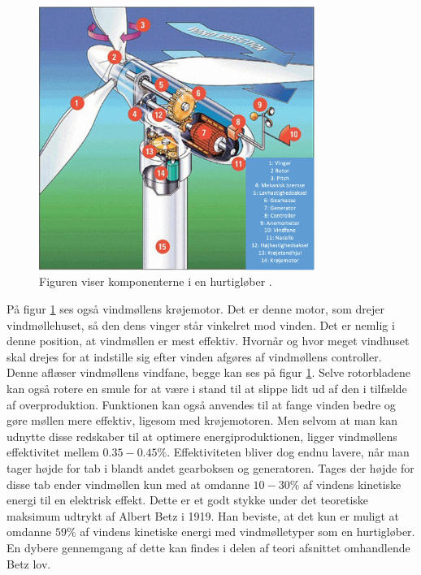 \begin{figure}[H]
\centering
\includegraphics[width=0.80\textwidth]{billeder/vindmollen}
\caption{Figuren viser komponenterne i en hurtigløber \citep{windturbine}.}
\label{fig:vindmollen}
\end{figure}

På figur \ref{fig:vindmollen} ses også vindmøllens krøjemotor. Det er denne motor, som drejer vindmøllehuset, så den dens vinger står vinkelret mod vinden. Det er nemlig i denne position, at vindmøllen er mest effektiv. Hvornår og hvor meget vindhuset skal drejes for at indstille sig efter vinden afgøres af vindmøllens controller. Denne aflæser vindmøllens vindfane, begge kan ses på figur \ref{fig:vindmollen}. Selve rotorbladene kan også rotere en smule for at være i stand til  at slippe lidt ud af den i tilfælde af overproduktion. Funktionen kan også anvendes til at fange vinden bedre og gøre møllen mere effektiv, ligesom med krøjemotoren. 
Men selvom at man kan udnytte disse redskaber til at optimere energiproduktionen, ligger vindmøllens effektivitet mellem $0.35-0.45 \%$.
Effektiviteten bliver dog endnu lavere, når man tager højde for tab i blandt andet gearboksen og generatoren. Tages der højde for disse tab ender vindmøllen kun med at omdanne $10-30 \%$ af vindens kinetiske energi til en elektrisk effekt.
Dette er et godt stykke under det teoretiske maksimum udtrykt af Albert Betz i 1919. Han beviste, at det kun er muligt at omdanne $59 \%$ af vindens kinetiske energi med vindmølletyper som en hurtigløber. En dybere gennemgang af dette kan findes i delen af teori afsnittet omhandlende Betz lov. 

